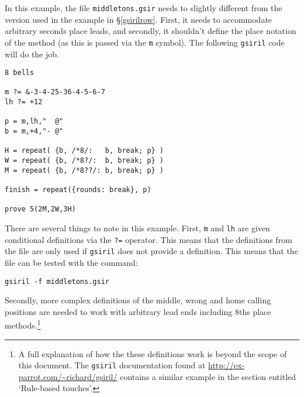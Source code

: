 \documentclass[a4paper,11pt,oneside]{book}
\newcommand{\sref}[1]{\hyperref[#1]{\S\ref{#1}}}
\begin{document}
In this example, the file \verb+middletons.gsir+ needs to slightly different
from the version used in the example in \sref{gsirilrow}.  First, it needs
to accommodate arbitrary seconds place leads, and secondly, it shouldn't 
define the place notation of the method (as this is passed via the \verb+m+
symbol).  The following \texttt{gsiril} code will do the job.
\begin{Verbatim}
8 bells

m ?= &-3-4-25-36-4-5-6-7
lh ?= +12

p = m,lh,"  @"
b = m,+4,"- @"

H = repeat( {b, /*8/:   b, break; p} )
W = repeat( {b, /*8?/:  b, break; p} )
M = repeat( {b, /*8??/: b, break; p} )

finish = repeat({rounds: break}, p)

prove 5(2M,2W,3H)
\end{Verbatim}

There are several things to note in this example.  First, \verb+m+ and
\verb+lh+ are given conditional definitions via the \verb+?=+ operator.
This means that the definitions from the file are only used if \texttt{gsiril}
does not provide a definition.  This means that the file can be tested
with the command:

\begin{Verbatim}
gsiril -f middletons.gsir
\end{Verbatim}

Secondly, more complex definitions of the middle, 
wrong and home calling positions are needed
to work with arbitrary lead ends including 8ths
place methods.\footnote{A full explanation of how the these definitions work
is beyond the scope of this document.  The \texttt{gsiril} 
documentation found at \url{http://ex-parrot.com/~richard/gsiril/} contains 
a similar example in the section entitled `Rule-based touches'.}

\end{document}
